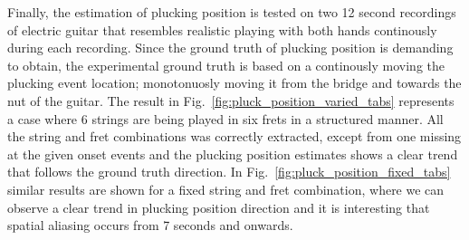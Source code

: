\documentclass{article}
\begin{document}
%
%
%
%
Finally, the estimation of plucking position is tested on two 12 second recordings of electric guitar that resembles realistic playing with both hands continously during each recording. Since the ground truth of plucking position is demanding to obtain, the experimental ground truth is based on a continously moving the plucking event location; monotonuosly moving it from the bridge and towards the nut of the guitar. The result in Fig.~\ref{fig:pluck_position_varied_tabs} represents a case where 6 strings are being played in six frets in a structured manner. All the string and fret combinations was correctly extracted, except from one missing at the given onset events and the plucking position estimates shows a clear trend that follows the ground truth direction. In Fig.~\ref{fig:pluck_position_fixed_tabs} similar results are shown for a fixed string and fret combination, where we can observe a clear trend in plucking position direction and it is interesting that spatial aliasing occurs from 7 seconds and onwards. %
%
%
%
%
%
%
\end{document}
